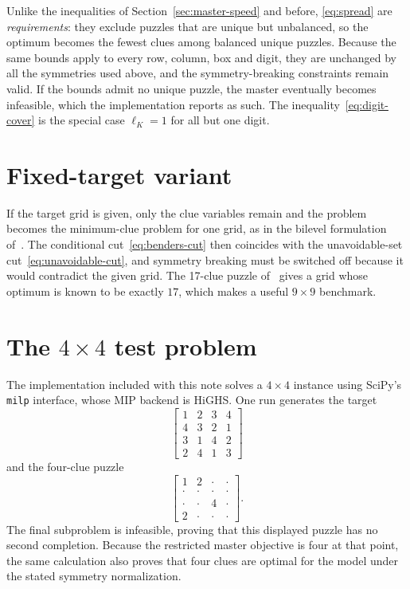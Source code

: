 \documentclass[11pt]{article}
\begin{document}
Unlike the inequalities of Section~\ref{sec:master-speed} and before, \eqref{eq:spread} are \emph{requirements}: they exclude puzzles that are unique but unbalanced, so the optimum becomes the fewest clues among balanced unique puzzles. Because the same bounds apply to every row, column, box and digit, they are unchanged by all the symmetries used above, and the symmetry-breaking constraints remain valid. If the bounds admit no unique puzzle, the master eventually becomes infeasible, which the implementation reports as such. The inequality~\eqref{eq:digit-cover} is the special case $\ell_K=1$ for all but one digit.

\section{Fixed-target variant}

If the target grid is given, only the clue variables remain and the problem becomes the minimum-clue problem for one grid, as in the bilevel formulation of~\cite{bilevel}. The conditional cut~\eqref{eq:benders-cut} then coincides with the unavoidable-set cut~\eqref{eq:unavoidable-cut}, and symmetry breaking must be switched off because it would contradict the given grid. The 17-clue puzzle of~\cite{mcguire} gives a grid whose optimum is known to be exactly $17$, which makes a useful $9\times9$ benchmark.

\section{The $4\times4$ test problem}

The implementation included with this note solves a $4\times4$ instance using SciPy's \texttt{milp} interface, whose MIP backend is HiGHS. One run generates the target
\[
\begin{bmatrix}
1&2&3&4\\
4&3&2&1\\
3&1&4&2\\
2&4&1&3
\end{bmatrix}
\]
and the four-clue puzzle
\[
\begin{bmatrix}
1&2&\cdot&\cdot\\
\cdot&\cdot&\cdot&\cdot\\
\cdot&\cdot&4&\cdot\\
2&\cdot&\cdot&\cdot
\end{bmatrix}.
\]
The final subproblem is infeasible, proving that this displayed puzzle has no second completion. Because the restricted master objective is four at that point, the same calculation also proves that four clues are optimal for the model under the stated symmetry normalization.
\end{document}
